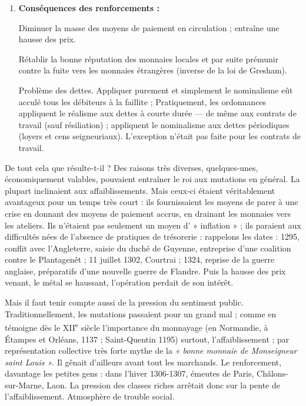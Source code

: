 \documentclass[french,twoside]{book} %
\begin{document}
\begin{enumerate}[itemsep=\baselineskip,]
\item {\bfseries Conséquences des renforcements :}\par
Diminuer la masse des moyens de paiement en circulation ; entraîne une hausse des prix.\par
Rétablir la bonne réputation des monnaies locales et par suite prémunir contre la fuite vers les monnaies étrangères (inverse de la loi de Gresham).\par
Problème des dettes. Appliquer purement et simplement le nominalisme eût acculé tous les débiteurs à la faillite ; Pratiquement, les ordonnances appliquent le réalisme aux dettes à courte durée — de même aux contrats de travail (sauf résiliation) ; appliquent le nominalisme aux dettes périodiques (loyers et cens seigneuriaux). L’exception n’était pas faite pour les contrats de travail.


\end{enumerate}\noindent De tout cela que résulte-t-il ? Des raisons très diverses, quelques-unes, économiquement valables, pouvaient entraîner le roi aux mutations en général. La plupart inclinaient aux affaiblissements. Mais ceux-ci étaient véritablement avantageux pour un temps très court : ils fournissaient les moyens de parer à une crise en donnant des moyens de paiement accrus, en drainant les monnaies vers les ateliers. Ils n’étaient pas seulement un moyen d’ » inflation » ; ils paraient aux difficultés nées de l’absence de pratiques de trésorerie :  
\label{p94} rappelons les dates : 1295, conflit avec l’Angleterre, saisie du duché de Guyenne, entreprise d’une coalition contre le Plantagenêt ; 11 juillet 1302, Courtrai ; 1324, reprise de la guerre anglaise, préparatifs d’une nouvelle guerre de Flandre. Puis la hausse des prix venant, le métal se haussant, l’opération perdait de son intérêt.\par
Mais il faut tenir compte aussi de la pression du sentiment public. Traditionnellement, les mutations passaient pour un grand mal ; comme en témoigne dès le XII\textsuperscript{e} siècle l’importance du monnayage (en Normandie, à Étampes et Orléans, 1137 ; Saint-Quentin 1195) surtout, l’affaiblissement ; par représentation collective très forte mythe de la \emph{« bonne monnaie de Monseigneur saint Louis »}. Il gênait d’ailleurs avant tout les marchands. Le renforcement, davantage les petites gens : dans l’hiver 1306-1307, émeutes de Paris, Châlons-sur-Marne, Laon. La pression des classes riches arrêtait donc sur la pente de l’affaiblissement. Atmosphère de trouble social.\par
\end{document}
